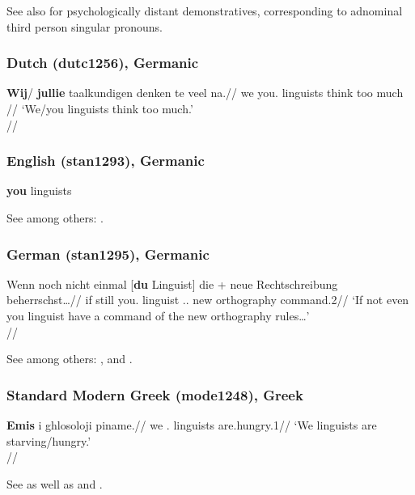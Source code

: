 \documentclass[A4paper]{article}
\begin{document}
See also \citet{johannessen2008} for psychologically distant demonstratives, corresponding to adnominal third person singular pronouns. 

\subsubsection{Dutch (dutc1256), Germanic}

\ex
\begingl
\gla \textbf{Wij}/ \textbf{jullie} taalkundigen denken te veel na.//
\glb we you.\Pl{} linguists think too much \Prtcl{}//
\glft `We/you linguists think too much.'\\\citep[52, (23a)]{corver2008vocative}//
\endgl
\xe 


\subsubsection{English (stan1293), Germanic}

\ex \textbf{you} linguists\xe

See among others: \citet{postal1969, delormedougherty1972, sommerstein1972, pesetsky1978, keizer2016}.

\subsubsection{German (stan1295), Germanic}

\ex
\begingl
\gla Wenn noch nicht einmal [\textbf{du} Linguist] die + neue Rechtschreibung beherrschst\ldots//
\glb if still \Neg{} \Prtcl{} you.\Sg{} linguist \Det.\Acc.\Sg{} new orthography command.2\Sg{}//
\glft `If not even you linguist have a command of the new orthography rules\ldots' \\{\citep[after][100, (36)]{rauh2004}}//
\endgl
\xe

See among others: \citet[ch. 6]{lawrenz1993}, \citet{rauh2003, rauh2004} and \citet{roehrs2005}.

\subsubsection{Standard Modern Greek (mode1248), Greek}

\ex 
\begingl
\gla \textbf{Emis} i ghlosoloji piname.//
\glb we \Det.\Pl{} linguists are.hungry.1\Pl{}//
\glft `We linguists are starving/hungry.'\\\citep[after][114, (12c)]{lekakouszendroi2012}//
\endgl
\xe 

See \citet{stavrou1995} as well as \citet[chs. 1/2]{choi2014phd} and \citet[sec. 5]{hoehn2015unagr}.
\end{document}
